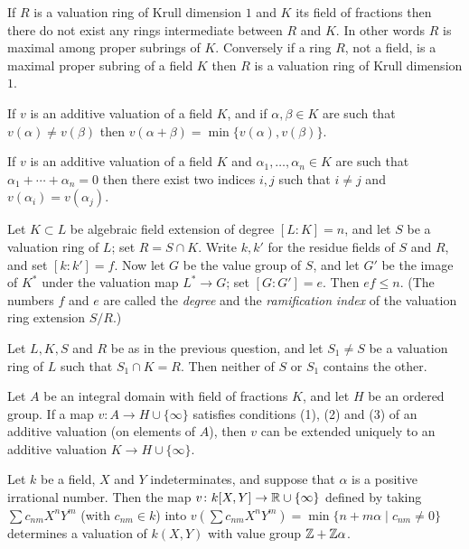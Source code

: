 \begin{exercise}\label{ex:10.5-ex}
If $R$ is a valuation ring of Krull dimension $1$ and $K$ its field of fractions then
there do not exist any rings intermediate between $R$ and $K$. In other words
$R$ is maximal among proper subrings of $K$. Conversely if a ring $R$, not a
field, is a maximal proper subring of a field $K$ then $R$ is a valuation ring of
Krull dimension $1$.
\end{exercise}

\begin{exercise}\label{ex:10.6-ex}
If $v$ is an additive valuation of a field $K$, and if $\alpha, \beta \in K$ are such that
$v(\alpha) \neq v(\beta)$ then $v(\alpha + \beta) = \min\{v(\alpha), v(\beta)\}$.
\end{exercise}

\begin{exercise}\label{ex:10.7-ex}
If $v$ is an additive valuation of a field $K$ and $\alpha_1, \ldots, \alpha_n \in K$ are such that
$\alpha_1 + \cdots + \alpha_n = 0$ then there exist two indices $i, j$ such that $i \neq j$ and
$v(\alpha_i) = v(\alpha_j)$.
\end{exercise}

\begin{exercise}\label{ex:10.8-ex}
Let $K \subset L$ be algebraic field extension of degree $[L:K] = n$, and let $S$ be
a valuation ring of $L$; set $R = S \cap K$. Write $k, k'$ for the residue fields of $S$
and $R$, and set $[k:k'] = f$. Now let $G$ be the value group of $S$, and let $G'$ be
the image of $K^*$ under the valuation map $L^* \to G$; set $[G:G'] = e$. Then
$ef \le n$. (The numbers $f$ and $e$ are called the \emph{degree} and the \emph{ramification}
\emph{index} of the valuation ring extension $S/R$.)
\end{exercise}

\begin{exercise}\label{ex:10.9-ex}
Let $L, K, S$ and $R$ be as in the previous question, and let $S_1 \neq S$ be a
valuation ring of $L$ such that $S_1 \cap K = R$. Then neither of $S$ or $S_1$ contains
the other.
\end{exercise}

\begin{exercise}\label{ex:10.10-ex}
Let $A$ be an integral domain with field of fractions $K$, and let $H$ be an
ordered group. If a map $v\colon A \to H \cup \{\infty\}$ satisfies conditions (1), (2) and (3)
of an additive valuation (on elements of $A$), then $v$ can be extended
uniquely to an additive valuation $K \to H \cup \{\infty\}$.
\end{exercise}

\begin{exercise}\label{ex:10.11-ex}
Let $k$ be a field, $X$ and $Y$ indeterminates, and suppose that $\alpha$ is a positive
irrational number. Then the map $v\colon k[X, Y] \to \mathbb{R} \cup \{\infty\}$ defined by
taking $\sum c_{nm}X^nY^m$ (with $c_{nm} \in k$) into $v(\sum c_{nm}X^nY^m) = \min\{n +
m\alpha \mid c_{nm} \neq 0\}$ determines a valuation of $k(X, Y)$ with value group
$\mathbb{Z} + \mathbb{Z}\alpha$.
\end{exercise}
